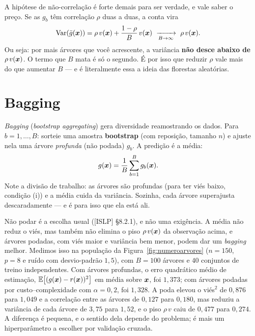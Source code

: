\documentclass[11pt,a4paper]{article}
\begin{document}
\begin{observacao}
A hipótese de não-correlação é forte demais para ser verdade, e vale saber o preço.
Se as $g_b$ têm correlação $\rho$ duas a duas, a conta vira
\[
  \operatorname{Var}(\bar g(\bm{x})) = \rho\, v(\bm{x}) + \frac{1-\rho}{B}\,v(\bm{x})
  \ \xrightarrow[B\to\infty]{}\ \rho\,v(\bm{x}).
\]
Ou seja: por mais árvores que você acrescente, a variância \textbf{não desce abaixo
de $\rho\,v(\bm{x})$}. O termo que $B$ mata é só o segundo. É por isso que reduzir
$\rho$ vale mais do que aumentar $B$ --- e é literalmente essa a ideia das florestas
aleatórias.
\end{observacao}

\section{Bagging}
\emph{Bagging} (\emph{bootstrap aggregating}) gera diversidade reamostrando os
dados. Para $b=1,\dots,B$: sorteie uma amostra \textbf{bootstrap} (com reposição,
tamanho $n$) e ajuste nela uma árvore \emph{profunda} (não podada) $g_b$. A predição
é a média:
\begin{equation}\label{eq:bagging}
  g(\bm{x}) = \frac1B\sum_{b=1}^B g_b(\bm{x}).
\end{equation}
Note a divisão de trabalho: as árvores são profundas (para ter viés baixo, condição
(i)) e a média cuida da variância. Sozinha, cada árvore superajusta
descaradamente --- e é para isso que ela está ali.

Não podar é a escolha usual ([ISLP] §8.2.1), e não uma exigência. A média não
reduz o viés, mas também não elimina o piso $\rho\,v(\bm{x})$ da observação acima, e
árvores podadas, com viés maior e variância bem menor, podem dar um \emph{bagging}
melhor. Medimos isso na população da Figura~\ref{fig:numeroarvores} ($n=150$, $p=8$
e ruído com desvio-padrão $1{,}5$), com $B=100$ árvores e $40$ conjuntos de treino
independentes. Com árvores profundas, o erro quadrático médio de estimação,
$\mathbb{E}\big[(g(\bm{x})-r(\bm{x}))^2\big]$ em média sobre $\bm{x}$, foi $1{,}373$; com árvores podadas
por custo--complexidade com $\alpha=0{,}2$, foi $1{,}328$. A poda elevou o viés$^2$
de $0{,}876$ para $1{,}049$ e a correlação entre as árvores de $0{,}127$ para
$0{,}180$, mas reduziu a variância de cada árvore de $3{,}75$ para $1{,}52$, e o piso
$\rho\,v$ caiu de $0{,}477$ para $0{,}274$. A diferença é pequena, e o sentido dela
depende do problema; é mais um hiperparâmetro a escolher por validação cruzada.
\end{document}
